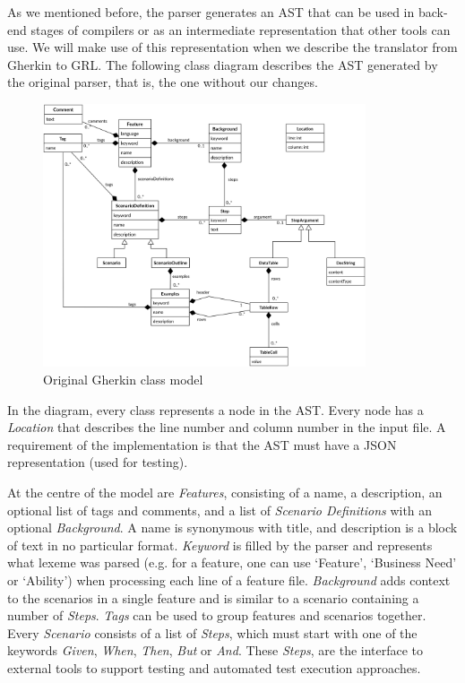 \documentclass[dissertation,final]{softeng}
\begin{document}
As we mentioned before, the parser generates an AST that can be used in back-end stages of compilers or as an intermediate representation that other tools can use. We will make use of this representation when we describe the translator from Gherkin to GRL. The following class diagram describes the AST generated by the original parser, that is, the one without our changes.

\begin{figure}[h!]
\includegraphics[width=0.85\textwidth]{gherkin3_ast}
\centering
\caption[Original Gherkin class model]{Original Gherkin class model~\footnotemark}
\label{fig:gherkin_ast}
\end{figure}

In the diagram, every class represents a node in the AST. Every node has a \emph{Location} that describes the line number and column number in the input file. A requirement of the implementation is that the AST must have a JSON representation (used for testing).

At the centre of the model are \emph{Features}, consisting of a name, a description, an optional list of tags and comments, and a list of \emph{Scenario Definitions} with an optional \emph{Background}. A name is synonymous with title, and description is a block of text in no particular format. \emph{Keyword} is filled by the parser and represents what lexeme was parsed (e.g. for a feature, one can use `Feature', `Business Need' or `Ability') when processing each line of a feature file. \emph{Background} adds context to the scenarios in a single feature and is similar to a scenario containing a number of \emph{Steps}. \emph{Tags} can be used to group features and scenarios together. Every \emph{Scenario} consists of a list of \emph{Steps}, which must start with one of the keywords \emph{Given}, \emph{When}, \emph{Then}, \emph{But} or \emph{And}. These \emph{Steps}, are the interface to external tools to support testing and automated test execution approaches.
\clearpage
\end{document}
